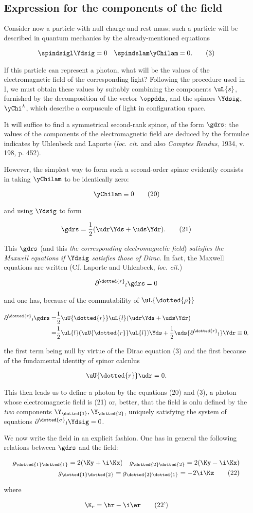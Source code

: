 \documentclass{article}
\newcommand{\nequ}[2]{
\begin{align*}
#1
\tag{#2}
\end{align*}
}
\newcommand{\uequ}[1]{
\begin{align*}
#1
\end{align*}
}
\newcommand{\var}[1]{#1}
\newcommand{\inv}[1]{\frac{1}{#1}}
\renewcommand{\it}[1]{\textit{#1}}
\newcommand{\spindUL}[2]{{{\partial^{#1}}_{#2}}}
\newcommand{\gdLL}[2]{\var{g}_{\dotted{#1}\dotted{#2}}}
\begin{document}
\begin{multicols}{2}
\section{Expression for the components of the field}
Consider now a particle with null charge and rest mass; such a particle will be described in quantum mechanics by the already-mentioned equations
\nequ{
\spindsigl\Ydsig = 0\quad\spindslam\yChilam = 0.
}{3}
If this particle can represent a photon, what will be the values of the electromagnetic field of the corresponding light? Following the procedure used in I, we must obtain these values by suitably combining the components $\uL{s}$, furnished by the decomposition of the vector $\oppddx$, and the spinors $\Ydsig$, $\yChi^{\lambda}$, which describe a corpuscule of light in configuration space.

It will suffice to find a symmetrical second-rank spinor, of the form $\gdrs$; the values of the components of the electromagnetic field are deduced by the formulae indicates by Uhlenbeck and Laporte (\it{loc. cit.} and also \it{Comptes Rendus}, 1934, v. 198, p. 452).

However, the simplest way to form such a second-order spinor evidently consists in taking $\yChilam$ to be identically zero:
\nequ{
\yChilam \equiv 0
}{20}
and using $\Ydsig$ to form
\nequ{
\gdrs = \inv{2}(\udr\Yds + \uds\Ydr).
}{21}
This $\gdrs$ (and this \it{the corresponding electromagnetic field}) \it{satisfies the Maxwell equations if $\Ydsig$ satisfies those of Dirac}. In fact, the Maxwell equations are written (Cf. Laporte and Uhlenbeck, \it{loc. cit.})
\uequ{
\spindUL{\dotted{r}}{l}\gdrs=0
}
and one has, because of the commutability of $\uL{\dotted{\rho}}$
\uequ{
\spindUL{\dotted{r}}{l}\gdrs=&\inv{2}\uU{\dotted{r}}\uL{l}(\udr\Yds + \uds\Ydr) \\
=&\inv{2}\uL{l}(\uU{\dotted{r}}\uL{l})\Yds
+\inv{2}\uds\spindUL{\dotted{r}}{l}\Ydr \equiv 0,
}
the first term being null by virtue of the Dirac equation (3) and the first because of the fundamental identity of spinor calculus
\uequ{
\uU{\dotted{r}}\udr=0.
}
This then leads us to define a photon by the equations (20) and (3), a photon whose electromagnetic field is (21) or, better, that the field is onlu defined by the \it{two} components $\Y_{\dotted{1}}, \Y_{\dotted{2}}$, uniquely satisfying the system of equations $\spindUL{\dotted{\sigma}}{l}\Ydsig=0$.

We now write the field in an explicit fashion. One has in general the following relations between $\gdrs$ and the field:
\nequ{
\gdLL{1}{1} = 2(\Ky + \i\Kx)\quad\gdLL{2}{2} = 2(\Ky - \i\Kx)\\
\gdLL{1}{2} = \gdLL{2}{1} = -2\i\Kz
}{22}
where
\nequ{
\K_{r} = \hr - \i\er
}{22'}


\end{multicols}
\end{document}

